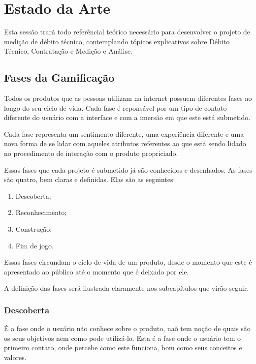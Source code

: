 \chapter[Estado da Arte]{Estado da Arte}

Esta sessão trará todo referêncial teórico necessário para desenvolver o projeto
de medição de débito técnico, contemplando tópicos explicativos sobre Débito Técnico,
Contratação e Medição e Análise.

\section{Fases da Gamificação}
\label{sub:fasesgamification}
Todos os produtos que as pessoas utilizam na internet possuem diferentes
fases ao longo do seu ciclo de vida. Cada fase é reponsável por um tipo de contato diferente 
do usuário com a interface e com a imersão em que este está submetido.

Cada fase representa um sentimento diferente, uma experiência diferente
e uma nova forma de se lidar com aqueles atributos referentes ao que está
sendo lidado no procedimento de interação com o produto propriciado.

Essas fases que cada projeto é submetido já são conhecidos e desenhados. As fases
são quatro, bem claras e definidas. Elas são as seguintes:

\begin{enumerate}
    \item Descoberta;
    \item Reconhecimento;
    \item Construção;
    \item Fim de jogo.
\end{enumerate}

Essas fases circundam o ciclo de vida de um produto, desde o momento que este
é apresentado ao público até o momento que é deixado por ele. 

A definição das fases será ilustrada claramente nos subcapítulos que virão seguir.

\subsection{Descoberta}
\label{sub:descoperta}
É a fase onde o usuário não conhece sobre o produto, naõ tem noção de quais são os
seus objetivos nem como pode utilizá-lo. Esta é a fase onde o usuário tem o primeiro
contato, onde percebe como este funciona, bom como seus conceitos e valores.

